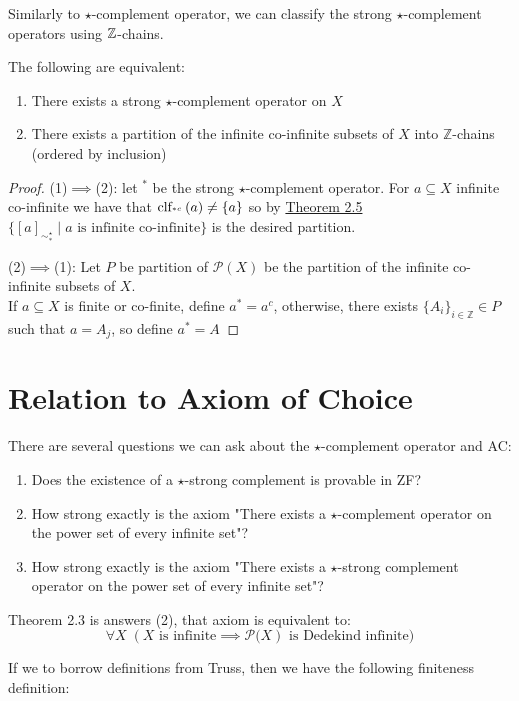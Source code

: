 	Similarly to $\star$-complement operator, we can classify the strong $\star$-complement operators using $\Bbb Z$-chains.
	\begin{theorem}\label{thm:3.4}
		The following are equivalent:
		\begin{enumerate}
			\item There exists a strong $\star$-complement operator on $X$
			\item There exists a partition of the infinite co-infinite subsets of $X$ into $\mathbb Z$-chains (ordered by inclusion)
		\end{enumerate}
	\end{theorem}
	\begin{proof}
		(1)$\implies$(2): let $^*$ be the strong $\star$-complement operator. For $a\subseteq X$ infinite co-infinite we have that $\clf{a}{^{*c}}\ne\{a\}$ so by \hyperref[thm:2.5]{Theorem 2.5} $\{[a]_{\sim_*^\star}\mid a\text{ is infinite co-infinite}\}$ is the desired partition.
		
		(2)$\implies$(1): Let $P$ be partition of $\mathcal{P}(X)$ be the partition of the infinite co-infinite subsets of $X$.\\
		If $a\subseteq X$ is finite or co-finite, define $a^*=a^c$, otherwise, there exists $\{A_i\}_{i\in\mathbb Z}\in P$ such that $a=A_j$, so  define $a^*=A_{}$
	\end{proof}

	
	\section{Relation to Axiom of Choice}
	There are several questions we can ask about the $\star$-complement operator and AC:
	\begin{enumerate}
		\item{ Does the existence of a $\star$-strong complement is provable in ZF?}
		\item{ How strong exactly is the axiom "There exists a $\star$-complement operator}{ on the power set of every infinite set"?}
		\item{ How strong exactly is the axiom "There exists a $\star$-strong complement}{ operator on the power set of every infinite set"?}
	\end{enumerate}
	
	Theorem 2.3 is answers (2), that axiom is equivalent to: $$\forall X\;(X\mbox{ is infinite}\implies\mathcal{P(}X)\mbox{ is Dedekind infinite})$$
	
	If we to borrow definitions from Truss\cite{ClassesOfDedekindDiniteCardinals}, then we have the following finiteness definition:
	
